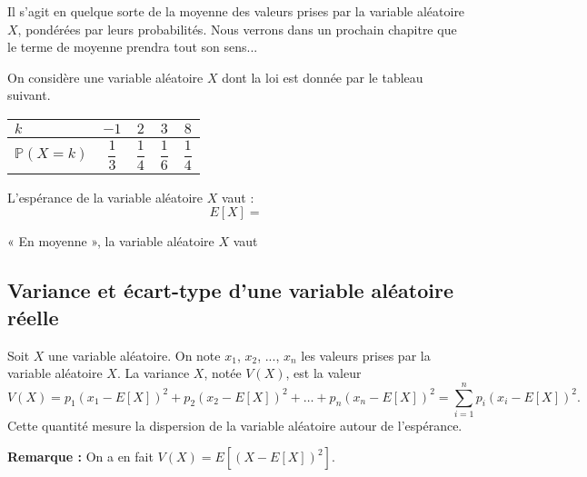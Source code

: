 \documentclass[11pt,fleqn, openany]{book} %
\begin{document}
Il s'agit en quelque sorte de la moyenne des valeurs prises par la variable aléatoire $X$, pondérées par leurs probabilités. Nous verrons dans un prochain chapitre que le terme de moyenne prendra tout son sens...
\newpage
\begin{example}On considère une variable aléatoire $X$ dont la loi est donnée par le tableau suivant.

\renewcommand{\arraystretch}{2.2}
\begin{center}
\begin{tabular}{|l|c|c|c|c|}
\hline
$k$ & $-1$& $2$ & $3$ & $8$ \\
\hline
$\mathbb{P}(X=k)$ & $\dfrac{1}{3}$ & $\dfrac{1}{4}$ & $\dfrac{1}{6}$ & $\dfrac{1}{4}$\\
\hline \end{tabular}
\end{center}


L'espérance de la variable aléatoire $X$ vaut :
\[ E[X]=\]

« En moyenne », la variable aléatoire $X$ vaut \end{example}

\subsection{Variance et écart-type d'une variable aléatoire réelle}

\begin{definition}Soit $X$ une variable aléatoire. On note $x_1$, $x_2$, ..., $x_n$ les valeurs prises par la variable aléatoire $X$.
La variance $X$, notée $V(X)$, est la valeur
\[ V(X)= p_1(x_1-E[X])^2+p_2(x_2-E[X])^2+\ldots + p_n( x_n-E[X])^2 = \sum _{i=1}^{n} p_i (x_i-E[X])^2.\]
Cette quantité mesure la dispersion de la variable aléatoire autour de l'espérance.\end{definition}

\textbf{Remarque :} On a en fait $V(X)= E[ (X-E[X])^2 ]$.
\end{document}
